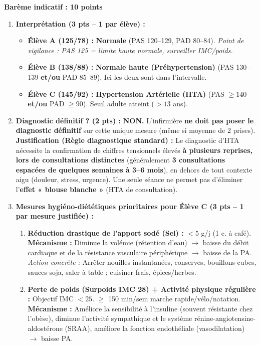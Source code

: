 \documentclass[11pt]{article}
\begin{document}
\begin{corrige}
\textbf{Barème indicatif : 10 points}
\begin{enumerate}
    \item \textbf{Interprétation (3 pts -- 1 par élève) :}
    \begin{itemize}
        \item \textbf{Élève A (125/78) :} \textbf{Normale} (PAS 120--129, PAD 80--84). \emph{Point de vigilance : PAS 125 = limite haute normale, surveiller IMC/poids.}
        \item \textbf{Élève B (138/88) :} \textbf{Normale haute (Préhypertension)} (PAS 130--139 \textbf{et/ou} PAD 85--89). Ici les deux sont dans l'intervalle.
        \item \textbf{Élève C (145/92) :} \textbf{Hypertension Artérielle (HTA)} (PAS $\ge 140$ \textbf{et/ou} PAD $\ge 90$). Seuil adulte atteint ($> 13$ ans).
    \end{itemize}
    \item \textbf{Diagnostic définitif ? (2 pts) :} \textbf{NON.} L'infirmière \textbf{ne doit pas poser le diagnostic définitif} sur cette unique mesure (même si moyenne de 2 prises).
    \textbf{Justification (Règle diagnostique standard) :} Le diagnostic d'HTA nécessite la confirmation de chiffres tensionnels élevés \textbf{à plusieurs reprises, lors de consultations distinctes} (généralement \textbf{3 consultations espacées de quelques semaines à 3--6 mois}), en dehors de tout contexte aigu (douleur, stress, urgence). Une seule séance ne permet pas d'éliminer l'\textbf{effet « blouse blanche »} (HTA de consultation).
    \item \textbf{Mesures hygiéno-diététiques prioritaires pour Élève C (3 pts -- 1 par mesure justifiée) :}
    \begin{enumerate}
        \item \textbf{Réduction drastique de l'apport sodé (Sel) :} $< 5$ g/j (1 c. à café). \textbf{Mécanisme :} Diminue la volémie (rétention d'eau) $\to$ baisse du débit cardiaque et de la résistance vasculaire périphérique $\to$ baisse de la PA. \emph{Action concrète :} Arrêter nouilles instantanées, conserves, bouillons cubes, sauces soja, saler à table ; cuisiner frais, épices/herbes.
        \item \textbf{Perte de poids (Surpoids IMC 28) + Activité physique régulière :} Objectif IMC $< 25$. $\ge$ 150 min/sem marche rapide/vélo/natation. \textbf{Mécanisme :} Améliore la sensibilité à l'insuline (souvent résistante chez l'obèse), diminue l'activité sympathique et le système rénine-angiotensine-aldostérone (SRAA), améliore la fonction endothéliale (vasodilatation) $\to$ baisse PA.

\end{enumerate}
\end{enumerate}
\end{corrige}
\end{document}
